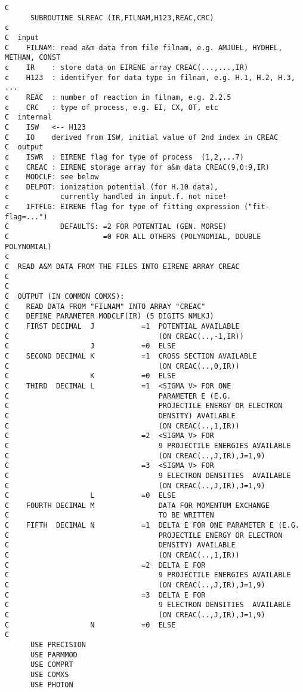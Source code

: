 \documentclass[12pt,dvipdfmx]{article}
\begin{document}
\begin{small}\begin{verbatim}
C
      SUBROUTINE SLREAC (IR,FILNAM,H123,REAC,CRC)
c
C  input
C    FILNAM: read a&m data from file filnam, e.g. AMJUEL, HYDHEL, METHAN, CONST
c    IR    : store data on EIRENE array CREAC(...,...,IR)
c    H123  : identifyer for data type in filnam, e.g. H.1, H.2, H.3, ...
c    REAC  : number of reaction in filnam, e.g. 2.2.5
c    CRC   : type of process, e.g. EI, CX, OT, etc
C  internal
C    ISW   <-- H123
C    IO    derived from ISW, initial value of 2nd index in CREAC
C  output
c    ISWR  : EIRENE flag for type of process  (1,2,...7)
c    CREAC : EIRENE storage array for a&m data CREAC(9,0:9,IR)
c    MODCLF: see below
c    DELPOT: ionization potential (for H.10 data),
c            currently handled in input.f. not nice!
c    IFTFLG: EIRENE flag for type of fitting expression ("fit-flag=...")
C            DEFAULTS: =2 FOR POTENTIAL (GEN. MORSE)
C                      =0 FOR ALL OTHERS (POLYNOMIAL, DOUBLE POLYNOMIAL)
c
C  READ A&M DATA FROM THE FILES INTO EIRENE ARRAY CREAC
C
C
C  OUTPUT (IN COMMON COMXS):
C    READ DATA FROM "FILNAM" INTO ARRAY "CREAC"
C    DEFINE PARAMETER MODCLF(IR) (5 DIGITS NMLKJ)
C    FIRST DECIMAL  J           =1  POTENTIAL AVAILABLE
C                                   (ON CREAC(..,-1,IR))
C                   J           =0  ELSE
C    SECOND DECIMAL K           =1  CROSS SECTION AVAILABLE
C                                   (ON CREAC(..,0,IR))
C                   K           =0  ELSE
C    THIRD  DECIMAL L           =1  <SIGMA V> FOR ONE
C                                   PARAMETER E (E.G.
C                                   PROJECTILE ENERGY OR ELECTRON
C                                   DENSITY) AVAILABLE
C                                   (ON CREAC(..,1,IR))
C                               =2  <SIGMA V> FOR
C                                   9 PROJECTILE ENERGIES AVAILABLE
C                                   (ON CREAC(..,J,IR),J=1,9)
C                               =3  <SIGMA V> FOR
C                                   9 ELECTRON DENSITIES  AVAILABLE
C                                   (ON CREAC(..,J,IR),J=1,9)
C                   L           =0  ELSE
C    FOURTH DECIMAL M               DATA FOR MOMENTUM EXCHANGE
C                                   TO BE WRITTEN
C    FIFTH  DECIMAL N           =1  DELTA E FOR ONE PARAMETER E (E.G.
C                                   PROJECTILE ENERGY OR ELECTRON
C                                   DENSITY) AVAILABLE
C                                   (ON CREAC(..,1,IR))
C                               =2  DELTA E FOR
C                                   9 PROJECTILE ENERGIES AVAILABLE
C                                   (ON CREAC(..,J,IR),J=1,9)
C                               =3  DELTA E FOR
C                                   9 ELECTRON DENSITIES  AVAILABLE
C                                   (ON CREAC(..,J,IR),J=1,9)
C                   N           =0  ELSE
C
      USE PRECISION
      USE PARMMOD
      USE COMPRT
      USE COMXS
      USE PHOTON


\end{verbatim}
\end{small}
\end{document}
